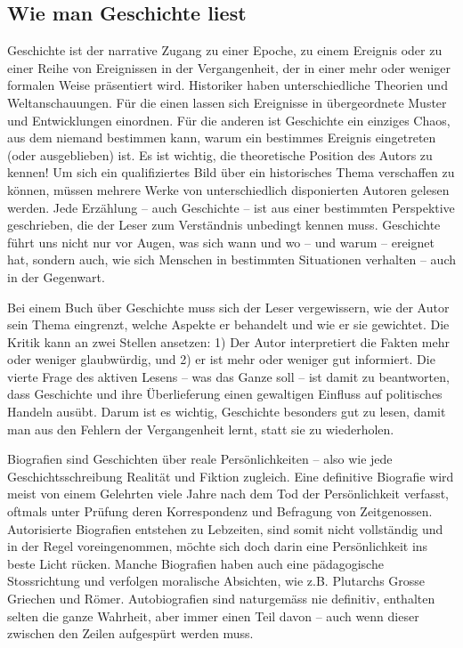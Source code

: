 \documentclass[a4paper,11pt]{scrartcl}
\begin{document}
\subsection{Wie man Geschichte liest}

Geschichte ist der narrative Zugang zu einer Epoche, zu einem Ereignis oder zu einer Reihe von Ereignissen in der Vergangenheit, der in einer mehr oder weniger formalen Weise präsentiert wird. Historiker haben unterschiedliche Theorien und Weltanschauungen. Für die einen lassen sich Ereignisse in übergeordnete Muster und Entwicklungen einordnen. Für die anderen ist Geschichte ein einziges Chaos, aus dem niemand bestimmen kann, warum ein bestimmes Ereignis eingetreten (oder ausgeblieben) ist. Es ist wichtig, die theoretische Position des Autors zu kennen! Um sich ein qualifiziertes Bild über ein historisches Thema verschaffen zu können, müssen mehrere Werke von unterschiedlich disponierten Autoren gelesen werden. Jede Erzählung – auch Geschichte – ist aus einer bestimmten Perspektive geschrieben, die der Leser zum Verständnis unbedingt kennen muss. Geschichte führt uns nicht nur vor Augen, was sich wann und wo – und warum – ereignet hat, sondern auch, wie sich Menschen in bestimmten Situationen verhalten – auch in der Gegenwart.

Bei einem Buch über Geschichte muss sich der Leser vergewissern, wie der Autor sein Thema eingrenzt, welche Aspekte er behandelt und wie er sie gewichtet. Die Kritik kann an zwei Stellen ansetzen: 1) Der Autor interpretiert die Fakten mehr oder weniger glaubwürdig, und 2) er ist mehr oder weniger gut informiert. Die vierte Frage des aktiven Lesens – was das Ganze soll – ist damit zu beantworten, dass Geschichte und ihre Überlieferung einen gewaltigen Einfluss auf politisches Handeln ausübt. Darum ist es wichtig, Geschichte besonders gut zu lesen, damit man aus den Fehlern der Vergangenheit lernt, statt sie zu wiederholen.

Biografien sind Geschichten über reale Persönlichkeiten – also wie jede Geschichtsschreibung Realität und Fiktion zugleich. Eine definitive Biografie wird meist von einem Gelehrten viele Jahre nach dem Tod der Persönlichkeit verfasst, oftmals unter Prüfung deren Korrespondenz und Befragung von Zeitgenossen. Autorisierte Biografien entstehen zu Lebzeiten, sind somit nicht vollständig und in der Regel voreingenommen, möchte sich doch darin eine Persönlichkeit ins beste Licht rücken. Manche Biografien haben auch eine pädagogische Stossrichtung und verfolgen moralische Absichten, wie z.B. Plutarchs Grosse Griechen und Römer. Autobiografien sind naturgemäss nie definitiv, enthalten selten die ganze Wahrheit, aber immer einen Teil davon – auch wenn dieser zwischen den Zeilen aufgespürt werden muss.
\end{document}
